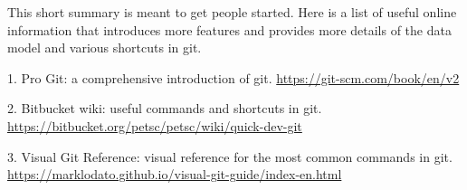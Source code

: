 \documentclass[runningheads,letterpaper]{llncs}
\begin{document}
This short summary is meant to get people started.
Here is a list of useful online information that introduces more features and provides more details of the data model and various shortcuts in git.

1. Pro Git: a comprehensive introduction of git. \url{https://git-scm.com/book/en/v2}

2. Bitbucket wiki: useful commands and shortcuts in git. \url{https://bitbucket.org/petsc/petsc/wiki/quick-dev-git}

3. Visual Git Reference: visual reference for the most common commands in git. \url{https://marklodato.github.io/visual-git-guide/index-en.html}
\end{document}
